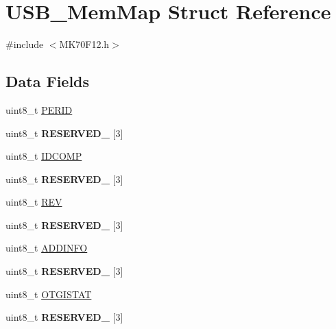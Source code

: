 \hypertarget{struct_u_s_b___mem_map}{}\section{U\+S\+B\+\_\+\+Mem\+Map Struct Reference}
\label{struct_u_s_b___mem_map}


{\ttfamily \#include $<$M\+K70\+F12.\+h$>$}

\subsection*{Data Fields}
\begin{DoxyCompactItemize}
\item 
uint8\+\_\+t \hyperlink{struct_u_s_b___mem_map_aa3644755d5a3d7b9a8c01055452ebe39}{P\+E\+R\+I\+D}
\item 
\hypertarget{struct_u_s_b___mem_map_a4b7eb7f7cc53dc2ce43ba695fdee3ced}{}uint8\+\_\+t {\bfseries R\+E\+S\+E\+R\+V\+E\+D\+\_} \mbox{[}3\mbox{]}\label{struct_u_s_b___mem_map_a4b7eb7f7cc53dc2ce43ba695fdee3ced}

\item 
uint8\+\_\+t \hyperlink{struct_u_s_b___mem_map_a87d65236c6baf792a723600b0623eca5}{I\+D\+C\+O\+M\+P}
\item 
\hypertarget{struct_u_s_b___mem_map_ad2d7e12d4409f3ca3b795edc099698b0}{}uint8\+\_\+t {\bfseries R\+E\+S\+E\+R\+V\+E\+D\+\_} \mbox{[}3\mbox{]}\label{struct_u_s_b___mem_map_ad2d7e12d4409f3ca3b795edc099698b0}

\item 
uint8\+\_\+t \hyperlink{struct_u_s_b___mem_map_ac918187248616aac7e5223124ea9610d}{R\+E\+V}
\item 
\hypertarget{struct_u_s_b___mem_map_a0a53453a4001c42a5cceb359c68097cc}{}uint8\+\_\+t {\bfseries R\+E\+S\+E\+R\+V\+E\+D\+\_} \mbox{[}3\mbox{]}\label{struct_u_s_b___mem_map_a0a53453a4001c42a5cceb359c68097cc}

\item 
uint8\+\_\+t \hyperlink{struct_u_s_b___mem_map_aa87a73875ff45abb9b84992687f48000}{A\+D\+D\+I\+N\+F\+O}
\item 
\hypertarget{struct_u_s_b___mem_map_abc1a41779b0653a09580c6dac4e39206}{}uint8\+\_\+t {\bfseries R\+E\+S\+E\+R\+V\+E\+D\+\_} \mbox{[}3\mbox{]}\label{struct_u_s_b___mem_map_abc1a41779b0653a09580c6dac4e39206}

\item 
uint8\+\_\+t \hyperlink{struct_u_s_b___mem_map_a6eacb73f23f815f7686f4e7bf7eb2fcc}{O\+T\+G\+I\+S\+T\+A\+T}
\item 
\hypertarget{struct_u_s_b___mem_map_ac3f90a346f328a9959bedeb9af0c48eb}{}uint8\+\_\+t {\bfseries R\+E\+S\+E\+R\+V\+E\+D\+\_} \mbox{[}3\mbox{]}\label{struct_u_s_b___mem_map_ac3f90a346f328a9959bedeb9af0c48eb}


\end{DoxyCompactItemize}
